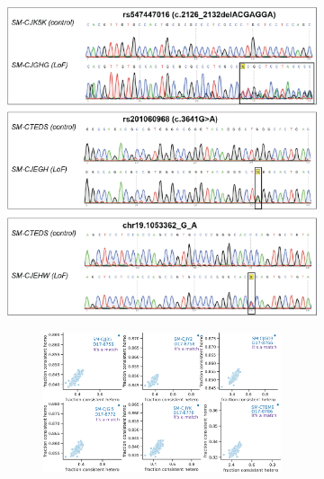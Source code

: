 \begin{figure}[H]
    \begin{subfigure}[t]{.5\textwidth}
        \caption{}
        \includegraphics[width=\textwidth]{./extended_plots/sanger_seq.png}        
    \end{subfigure}  
    \begin{subfigure}[t]{.5\textwidth}
        \begin{subfigure}[t]{\textwidth}
            \caption{}
            \includegraphics[width=\textwidth]{./extended_plots/sample_swap.png}        
        \end{subfigure}  
        \begin{subfigure}[t]{\textwidth}

\end{subfigure}
\end{subfigure}
\end{figure}
